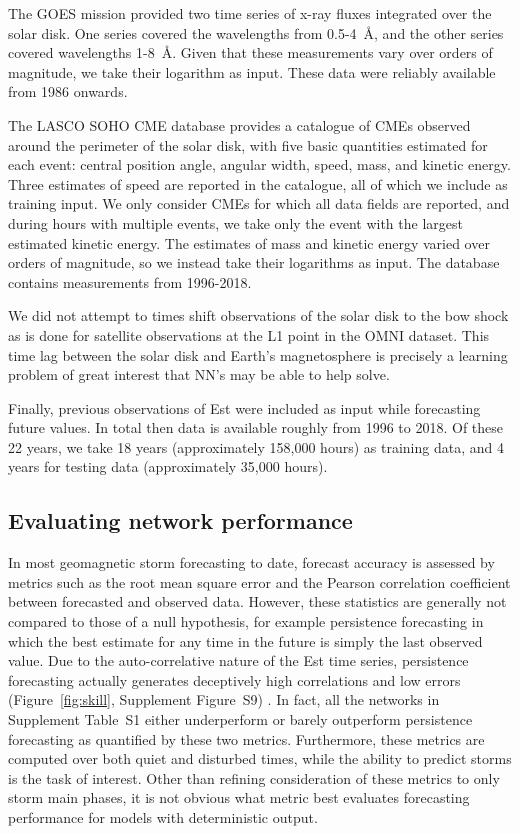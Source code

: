 The GOES mission provided two time series of x-ray fluxes integrated over the solar disk. One series covered the wavelengths from 0.5-4~\r{A}, and the other series covered wavelengths 1-8~\r{A}. Given that these measurements vary over orders of magnitude, we take their logarithm as input. These data were reliably available from 1986 onwards.

The LASCO SOHO CME database provides a catalogue of CMEs observed around the perimeter of the solar disk, with five basic quantities estimated for each event: central position angle, angular width, speed, mass, and kinetic energy. Three estimates of speed are reported in the catalogue, all of which we include as training input. We only consider CMEs for which all data fields are reported, and during hours with multiple events, we take only the event with the largest estimated kinetic energy. The estimates of mass and kinetic energy varied over orders of magnitude, so we instead take their logarithms as input. The database contains measurements from 1996-2018.

We did not attempt to times shift observations of the solar disk to the bow shock as is done for satellite observations at the L1 point in the OMNI dataset. This time lag between the solar disk and Earth's magnetosphere is precisely a learning problem of great interest that NN's may be able to help solve. 

Finally, previous observations of Est were included as input while forecasting future values. In total then data is available roughly from 1996 to 2018. Of these 22 years, we take 18 years (approximately 158,000 hours) as training data, and 4 years for testing data (approximately 35,000 hours).


\subsection{Evaluating network performance}
In most geomagnetic storm forecasting to date, forecast accuracy is assessed by metrics such as the root mean square error and the Pearson correlation coefficient between forecasted and observed data. However, these statistics are generally not compared to those of a null hypothesis, for example persistence forecasting in which the best estimate for any time in the future is simply the last observed value. Due to the auto-correlative nature of the Est time series, persistence forecasting actually generates deceptively high correlations and low errors (Figure~\ref{fig:skill}, Supplement Figure~S9) \citep{Shprits2019}. In fact, all the networks in Supplement Table~S1 either underperform or barely outperform persistence forecasting as quantified by these two metrics. Furthermore, these metrics are computed over both quiet and disturbed times, while the ability to predict storms is the task of interest. Other than refining consideration of these metrics to only storm main phases, it is not obvious what metric best evaluates forecasting performance for models with deterministic output. 

